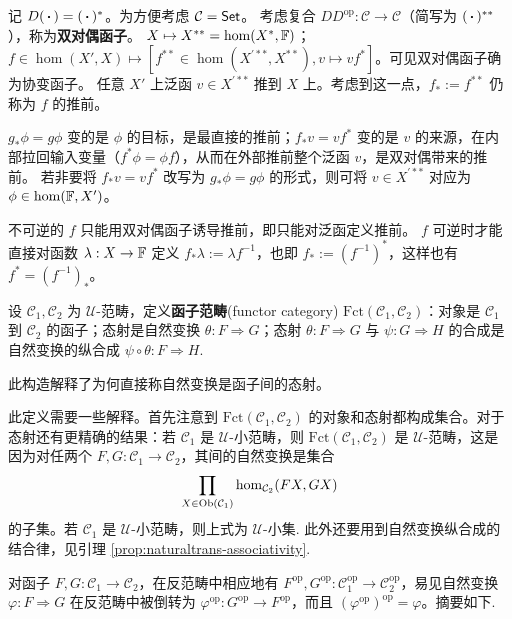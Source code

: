 \begin{example}
	记 $D(\oo)=(\oo)^*$。为方便考虑 $\mathcal{C}=\mathsf{Set}$。
	考虑复合 $DD^\mathrm{op}:\mathcal{C}\to\mathcal{C}$（简写为 $(\oo)^{**}$），称为\textbf{双对偶函子}。
	$X\mapsto X^{**}=\hom(X^*,\mathbb{F})$；
	$f\in\hom(X', X)\mapsto [f^{**}\in\hom(X^{\prime **},X^{**}), v\mapsto v f^*]$。可见双对偶函子确为协变函子。
	任意 $X'$ 上泛函 $v\in X^{\prime **}$ 推到 $X$ 上。考虑到这一点，$f_* := f^{**}$ 仍称为 $f$ 的推前。
	
	$g_*\phi=g\phi$ 变的是 $\phi$ 的目标，是最直接的推前；$f_*v=vf^*$ 变的是 $v$ 的来源，在内部拉回输入变量（$f^*\phi=\phi f$），从而在外部推前整个泛函 $v$，是双对偶带来的推前。
	若非要将 $f_*v=vf^*$ 改写为 $g_*\phi=g\phi$ 的形式，则可将 $v\in X^{\prime **}$ 对应为 $\phi \in\hom(\mathbb{F},X')$。
\end{example}

\begin{remark}
    不可逆的 $f$ 只能用双对偶函子诱导推前，即只能对泛函定义推前。
    $f$ 可逆时才能直接对函数 $\lambda:X\to\mathbb{F}$ 定义 $f_*\lambda:=\lambda f^{-1}$，也即 $f_*:=(f^{-1})^*$，这样也有 $f^*=(f^{-1})_*$。
\end{remark}

\begin{definition}
	设 $\mathcal{C}_1, \mathcal{C}_2$ 为 $\mathcal{U}$-范畴，定义\textbf{函子范畴}(functor category) $\mathrm{Fct}(\mathcal{C}_1, \mathcal{C}_2)$：对象是 $\mathcal{C}_1$ 到 $\mathcal{C}_2$ 的函子；态射是自然变换 $\theta: F \Rightarrow G$；态射 $\theta: F \Rightarrow G$ 与 $\psi: G \Rightarrow H$ 的合成是自然变换的纵合成 $\psi \circ \theta: F \Rightarrow H$.
\end{definition}
此构造解释了为何直接称自然变换是函子间的态射。

\begin{remark}
	此定义需要一些解释。首先注意到 $\mathrm{Fct}(\mathcal{C}_1, \mathcal{C}_2)$ 的对象和态射都构成集合。对于态射还有更精确的结果：若 $\mathcal{C}_1$ 是 $\mathcal{U}$-小范畴，则 $\mathrm{Fct}(\mathcal{C}_1, \mathcal{C}_2)$ 是 $\mathcal{U}$-范畴，这是因为对任两个 $F, G: \mathcal{C}_1 \to \mathcal{C}_2$，其间的自然变换是集合
	\[ \prod_{X \in \operatorname{Ob}(\mathcal{C}_1)} \hom_{\mathcal{C}_2} (FX, GX) \]
	的子集。若 $\mathcal{C}_1$ 是 $\mathcal{U}$-小范畴，则上式为 $\mathcal{U}$-小集.
	此外还要用到自然变换纵合成的结合律，见引理 \ref{prop:naturaltrans-associativity}.
\end{remark}

对函子 $F, G : \mathcal{C}_1 \to \mathcal{C}_2$，在反范畴中相应地有 $F^\mathrm{op}, G^\mathrm{op}: \mathcal{C}_1^\mathrm{op} \to \mathcal{C}_2^\mathrm{op}$，易见自然变换 $\varphi: F \Rightarrow G$ 在反范畴中被倒转为 $\varphi^\mathrm{op}: G^\mathrm{op} \to F^\mathrm{op}$，而且 $(\varphi^{\mathrm{op}})^{\mathrm{op}} = \varphi$。摘要如下.

